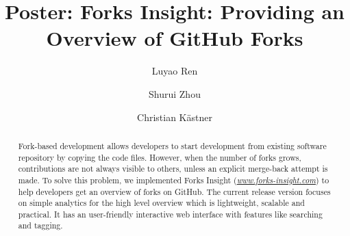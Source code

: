 \documentclass[sigconf]{acmart}
\begin{document}
\title{Poster: Forks Insight: Providing an Overview of GitHub Forks}

	\author{Luyao Ren}

	\author{Shurui Zhou}
	
	\author{Christian K\"{a}stner} 

	\iffalse
       \author{Andrzej W\k{a}sowski}
	\affiliation{%
		\institution{IT University of Copenhagen}
	}
	\fi


	\renewcommand{\shortauthors}{L. Ren et al.}
	

\begin{abstract}
Fork-based development allows developers to start development from existing software repository by copying the code files. However, when the number of forks grows, contributions are not always visible to others, unless an explicit merge-back attempt is made. To solve this problem, we implemented Forks Insight (\emph{\url{www.forks-insight.com}}) to help developers get an overview of forks on GitHub. The current release version focuses on simple analytics for the high level overview which is lightweight, scalable and practical. It has an user-friendly interactive web interface with features like searching and tagging.

\end{abstract}



\maketitle



 
\end{document}
